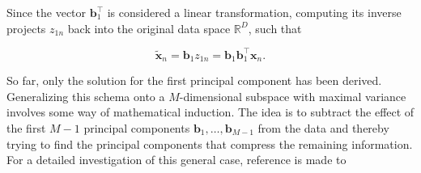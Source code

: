 \documentclass[../../../main.tex]{subfiles}
\begin{document}
Since the vector $\bm{b}_1^\top$ is considered a linear transformation, computing its inverse projects $z_{1n}$ back into the original data space $\mathbb{R}^D$, such that

\begin{equation*}
    \tilde{\bm{x}}_n = \bm{b}_1z_{1n} = \bm{b}_1 \bm{b}_1^\top \bm{x}_n.
\end{equation*}

So far, only the solution for the first principal component has been derived. Generalizing this schema onto a $M$-dimensional subspace with maximal variance involves some way of mathematical induction. The idea is to subtract the effect of the first $M-1$ principal components $\bm{b}_1, \dots, \bm{b}_{M-1}$ from the data and thereby trying to find the principal components that compress the remaining information. For a detailed investigation of this general case, reference is made to \cite[pp.291]{dei_2020}
\end{document}
